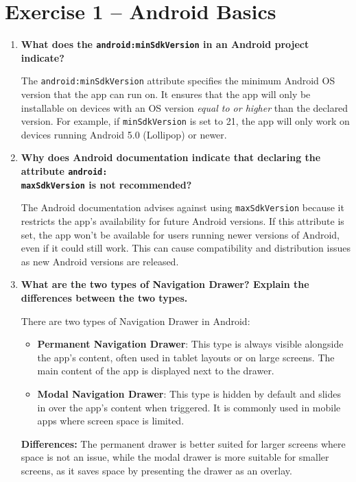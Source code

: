 \section{Exercise 1 – Android Basics}

\begin{enumerate}
    \item  \textbf{What does the \texttt{android:minSdkVersion} in an Android project indicate?}

    The \texttt{android:minSdkVersion} attribute specifies the minimum Android OS version that the app can run on. It ensures that the app will only be installable on devices with an OS version \textit{equal to or higher} than the declared version. For example, if \texttt{minSdkVersion} is set to 21, the app will only work on devices running Android 5.0 (Lollipop) or newer.
    \\
    
    \item \textbf{Why does Android documentation indicate that declaring the attribute \texttt{android:\\maxSdkVersion} is not recommended?}

    The Android documentation advises against using \texttt{maxSdkVersion} because it restricts the app's availability for future Android versions. If this attribute is set, the app won't be available for users running newer versions of Android, even if it could still work. This can cause compatibility and distribution issues as new Android versions are released.
    \\
    
    \item \textbf{What are the two types of Navigation Drawer? Explain the differences between the two types.}

    There are two types of Navigation Drawer in Android:
    \begin{itemize}
        \item \textbf{Permanent Navigation Drawer}: This type is always visible alongside the app's content, often used in tablet layouts or on large screens. The main content of the app is displayed next to the drawer.
        \item \textbf{Modal Navigation Drawer}: This type is hidden by default and slides in over the app's content when triggered. It is commonly used in mobile apps where screen space is limited.
    \end{itemize}
    

    \textbf{Differences:} The permanent drawer is better suited for larger screens where space is not an issue, while the modal drawer is more suitable for smaller screens, as it saves space by presenting the drawer as an overlay.
\end{enumerate}